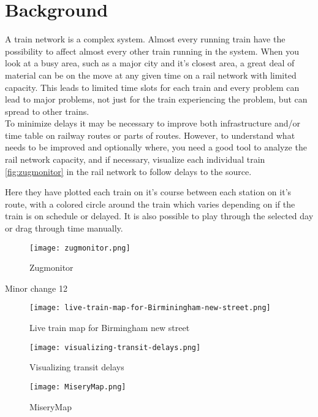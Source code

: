 
\chapter{Background}



A train network is a complex system. Almost every running train have the 
possibility to affect almost every other train running in the system.  When you look at a busy area, such as a major city and it's closest
area, a great deal of material can be on the move at any given time on a
rail network with limited capacity. This leads to limited time slots for each train and every
problem can lead to major problems, not just for the train experiencing the
problem, but can spread to other trains. \\

To minimize delays it may be necessary to improve both infrastructure and/or
time table on railway routes or parts of routes. However, to understand what
needs to be improved and optionally where, you need a good tool to analyze the
rail network capacity, and if necessary, visualize each individual train \vref{fig:zugmonitor} in the rail network to follow delays to the source.

Here they have plotted each train on it's course between each station on it's
route, with a colored circle around the train which varies depending on if the
train is on schedule or delayed. It is also possible to play through the
selected day or drag through time manually.

\begin{figure}[!htbp]
	\texttt{[image: zugmonitor.png]}
	\caption[Zugmonitor]{Zugmonitor \cite{zugmonitor}}
	\label{fig:zugmonitor}
\end{figure}

Minor change 12

\begin{figure}[!htbp]
	\texttt{[image: live-train-map-for-Birminingham-new-street.png]}
	\caption[Live train map for Birmingham new street]{Live train map for Birmingham new street \cite{birminghamLiveMap}}
	\label{fig:birminghamLiveMap}
\end{figure}

\begin{figure}[!htbp]
	\texttt{[image: visualizing-transit-delays.png]}
	\caption[Visualizing transit delays]{Visualizing transit delays \cite{muniLightRail}}
	\label{fig:muniLightRail}
\end{figure}

\begin{figure}[!htbp]
	\texttt{[image: MiseryMap.png]}
	\caption[MiseryMap]{MiseryMap \cite{flightAware:MiseryMap}}
	\label{fig:miserymap}
\end{figure}
 
